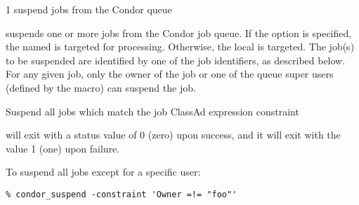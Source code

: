 \begin{ManPage}{\label{man-condor-suspend}}{1}
{suspend jobs from the Condor queue}
\Synopsis {}
\ToolArgsBase

\ToolDebugOption
\ToolLocate
{}


\Description

 suspends one or more jobs from the Condor job queue.  
If the  option is specified, the named  is targeted
for processing.  
Otherwise, the local  is targeted.
The job(s) to be suspended are identified by one of the job identifiers, as
described below.
For any given job, only the owner of the job or one of the queue super users
(defined by the  macro) can suspend the job.

\begin{Options}
	\ToolArgsBaseDesc
	\ToolLocateDesc
    \ToolDebugDesc
	 {Suspend all jobs which match
	                the job ClassAd expression constraint}
\end{Options}

\ExitStatus

 will exit with a status value of 0 (zero) upon success,
and it will exit with the value 1 (one) upon failure.

\Examples
To suspend all jobs except for a specific user:
\footnotesize
\begin{verbatim}
% condor_suspend -constraint 'Owner =!= "foo"'
\end{verbatim}
\normalsize

\end{ManPage}
